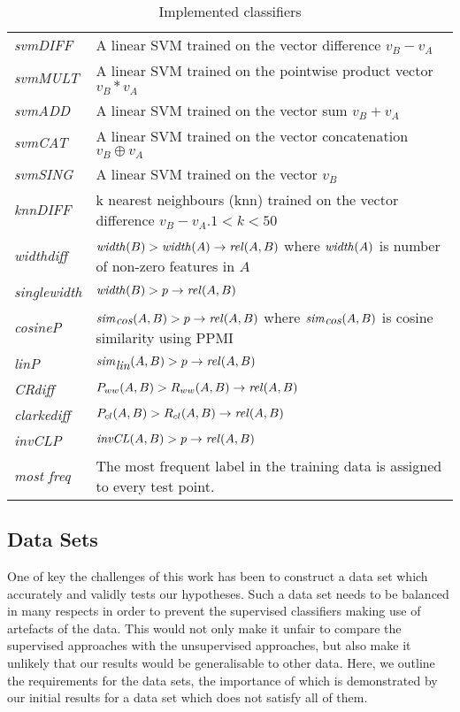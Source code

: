 \documentclass[11pt]{article}
\newcommand\invCL[1]{\mbox{\em invCL\/}(#1)}
\newcommand\simcos[1]{\mbox{\em sim\/}_{\mbox{\em cos}}(#1)}
\newcommand\simlin[1]{\mbox{\em sim\/}_{\mbox{\em lin}}(#1)}
\newcommand\width[1]{\mbox{\em width\/}(#1)}
\newcommand\rel[1]{\mbox{\em rel\/}(#1)}
\begin{document}
\begin{table*}[ht]
\centering
\begin{tabular}{|l|p{14cm}|}
\hline
\emph{svmDIFF}& A linear SVM trained on the vector difference $v_B - v_A$\\
\emph{svmMULT}& A linear SVM trained on the pointwise product vector $v_B * v_A$\\
\emph{svmADD}& A linear SVM trained on the vector sum $v_B + v_A$\\
\emph{svmCAT}& A linear SVM trained on the vector concatenation $v_B\oplus v_A$\\
\emph{svmSING}& A linear SVM trained on the vector $v_B$\\
\emph{knnDIFF}& k nearest neighbours (knn) trained on the vector difference $v_B - v_A$.$1< k<50$\\
\hline
\emph{widthdiff}& $\width{B} > \width{A} \rightarrow\rel{A,B}$  where $\width{A}$ is  number of non-zero features in $A$\\
\emph{singlewidth}& $\width{B} > p \rightarrow \rel{A,B}$\\
\emph{cosineP}& $\simcos{A,B} > p \rightarrow\rel{A,B}$ where $\simcos{A,B}$ is cosine similarity using PPMI\\
\emph{linP}&$\simlin{A,B} > p \rightarrow\rel{A,B}$ \cite{Lin1998}\\
\emph{CRdiff}& $P_{ww}(A,B) > R_{ww}(A,B) \rightarrow\rel{A,B}$  \cite{Weeds2004}\\
\emph{clarkediff}&$P_{cl}(A,B) > R_{cl}(A,B) \rightarrow\rel{A,B}$  \cite{Clarke:09}\\
\emph{invCLP}&$\invCL{A,B} > p \rightarrow\rel{A,B}$  \cite{Lenci2012}\\
\emph{most freq}&The most frequent label in the training data is assigned to every test point.\\
\hline
\end{tabular}
\caption{Implemented classifiers}
\label{table:classifiers}
\end{table*}

\subsection{Data Sets}
\label{sect:data}

One of key the challenges of this work has been to construct a data set which accurately and validly tests our hypotheses.  Such a data set needs to be balanced in many respects in order to prevent the supervised classifiers making use of artefacts of the data.  This would not only make it unfair to compare the supervised approaches with the unsupervised approaches, but also make it unlikely that our results would be generalisable to other data.  Here, we outline the requirements for the data sets, the importance of which is demonstrated by our initial results for a data set which does not satisfy all of them.
\end{document}
